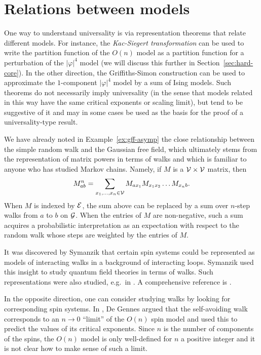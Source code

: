 \section{Relations between models}
\label{sec:spin-walk}

One way to understand universality is via representation theorems that relate
different models. For instance, the \emph{Kac-Siegert transformation}
can be used to write the partition function of the $O(n)$ model as a partition function
for a perturbation of the $|\varphi|^4$ model (we will discuss this further in
Section~\ref{sec:hard-core}). In the other direction, the
Griffiths-Simon construction \cite{SG73} can be used to approximate the $1$-component
$|\varphi|^4$ model by a sum of Ising models. Such theorems do not necessarily
imply universality
(in the sense that models related in this way have the same critical exponents or
scaling limit), but tend to be suggestive of it and may in some cases
be used as the basis for the proof of a universality-type result.

We have already noted in Example~\ref{ex:gff-asymp} the close relationship between
the simple random walk
and the Gaussian free field, which ultimately stems from the representation of
matrix powers in terms of walks and which is familiar to anyone
who has studied Markov chains. Namely, if $M$ is a $\mathcal{V}\times\mathcal{V}$
matrix, then
\begin{equation}
M^n_{ab} = \sum_{x_1,\ldots,x_n\in\mathcal{V}} M_{ax_1} M_{x_1x_2} \ldots M_{x_nb}.
\end{equation}
When $M$ is indexed by $\mathcal{E}$, the
sum above can be replaced by a sum over $n$-step walks from $a$ to $b$ on $\mathcal{G}$.
When the entries of $M$ are non-negative, such a sum acquires a probabilistic
interpretation as an expectation with respect to the random walk whose steps
are weighted by the entries of $M$.

It was discovered by Symanzik \cite{Syma69} that certain spin systems could be
represented as models of interacting walks in a background of interacting loops.
Symanzik used this insight to study quantum field theories in terms of walks.
Such representations were also studied, e.g.\ in \cite{BFS82,Dynk83}. A comprehensive
reference is \cite{FFS92}.

In the opposite direction, one can consider studying walks by looking for corresponding
spin systems. In \cite{Genn72}, De Gennes argued that the self-avoiding walk
corresponds to an $n \to 0$ ``limit'' of the $O(n)$ spin model and used this
to predict the values of its critical exponents. Since $n$ is
the number of components of the spins, the $O(n)$ model is only well-defined
for $n$ a positive integer and it is not clear how to make sense of such a limit.

